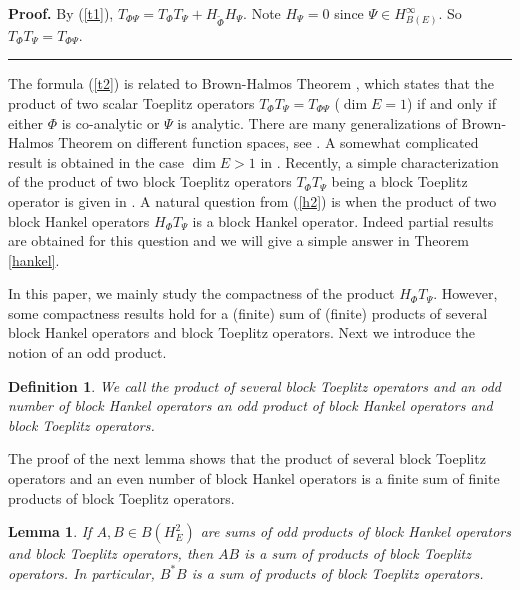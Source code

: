 \documentclass{article}%
\newtheorem{definition}[theorem]{Definition}
\newtheorem{lemma}[theorem]{Lemma}
\newenvironment{proof}[1][Proof]{\noindent\textbf{#1.} }{\ \rule{0.5em}{0.5em}}
\begin{document}
\begin{proof}
By (\ref{t1}), $T_{\Phi\Psi}=T_{\Phi}T_{\Psi}+H_{\widetilde{\Phi}}H_{\Psi}.$
Note $H_{\Psi}=0$ since $\Psi\in H_{B(E)}^{\infty}.$ So $T_{\Phi}T_{\Psi
}=T_{\Phi\Psi}.$
\end{proof}

The formula (\ref{t2}) is related to Brown-Halmos Theorem \cite{Brown Halmos},
which states that the product of two scalar Toeplitz operators $T_{\Phi
}T_{\Psi}=T_{\Phi\Psi}$ ($\dim E=1$) if and only if either $\Phi$ is
co-analytic or $\Psi$ is analytic. There are many generalizations of
Brown-Halmos Theorem on different function spaces, see
\cite{Ahern,GuArchiv,Murphy}. A somewhat complicated result is obtained in the
case $\dim E>1$ in \cite{BS2}. Recently, a simple characterization of the
product of two block Toeplitz operators $T_{\Phi}T_{\Psi}$ being a block
Toeplitz operator is given in \cite{GuH}. A natural question from (\ref{h2})
is when the product of two block Hankel operators $H_{\Phi}T_{\Psi}$ is a
block Hankel operator. Indeed partial results are obtained for this question
and we will give a simple answer in Theorem \ref{hankel}.

In this paper, we mainly study the compactness of the product $H_{\Phi}%
T_{\Psi}.$ However, some compactness results hold for a (finite) sum of
(finite) products of several block Hankel operators and block Toeplitz
operators. Next we introduce the notion of an odd product.

\begin{definition}
We call the product of several block Toeplitz operators and an odd number of
block Hankel operators an odd product of block Hankel operators and block
Toeplitz operators.
\end{definition}

The proof of the next lemma shows that the product of several block Toeplitz
operators and an even number of block Hankel operators is a finite sum of
finite products of block Toeplitz operators.

\begin{lemma}
\label{product}If $A,B\in B(H_{E}^{2})$ are sums of odd products of block
Hankel operators and block Toeplitz operators, then $AB$ is a sum of products
of block Toeplitz operators. In particular, $B^{\ast}B$ is a sum of products
of block Toeplitz operators.
\end{lemma}
\end{document}
